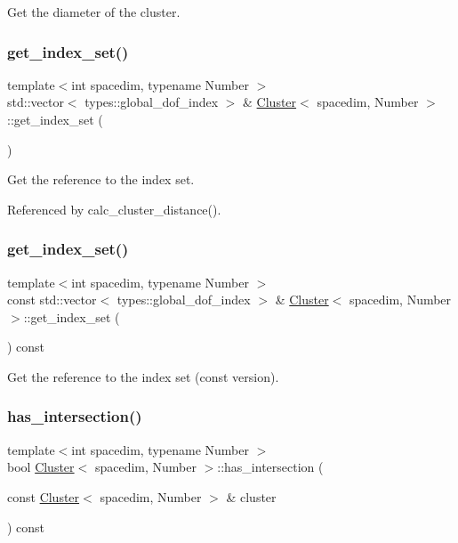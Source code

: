 Get the diameter of the cluster. \mbox{\label{classCluster_ada8786f2258b9fbeed2ed04bc1007c89}} 
\subsubsection{\texorpdfstring{get\+\_\+index\+\_\+set()}{get\_index\_set()}\hspace{0.1cm}{\footnotesize\ttfamily [1/2]}}
{\footnotesize\ttfamily template$<$int spacedim, typename Number $>$ \\
std\+::vector$<$ types\+::global\+\_\+dof\+\_\+index $>$ \& \hyperlink{classCluster}{Cluster}$<$ spacedim, Number $>$\+::get\+\_\+index\+\_\+set (\begin{DoxyParamCaption}{ }\end{DoxyParamCaption})}

Get the reference to the index set. 

Referenced by calc\+\_\+cluster\+\_\+distance().

\mbox{\label{classCluster_acd4c3a1c712aca32cffefb64f88a1b08}} 
\subsubsection{\texorpdfstring{get\+\_\+index\+\_\+set()}{get\_index\_set()}\hspace{0.1cm}{\footnotesize\ttfamily [2/2]}}
{\footnotesize\ttfamily template$<$int spacedim, typename Number $>$ \\
const std\+::vector$<$ types\+::global\+\_\+dof\+\_\+index $>$ \& \hyperlink{classCluster}{Cluster}$<$ spacedim, Number $>$\+::get\+\_\+index\+\_\+set (\begin{DoxyParamCaption}{ }\end{DoxyParamCaption}) const}

Get the reference to the index set (const version). \mbox{\label{classCluster_ad70ce1f046bb3b47fff585eaf6ec4856}} 
\subsubsection{\texorpdfstring{has\+\_\+intersection()}{has\_intersection()}}
{\footnotesize\ttfamily template$<$int spacedim, typename Number $>$ \\
bool \hyperlink{classCluster}{Cluster}$<$ spacedim, Number $>$\+::has\+\_\+intersection (\begin{DoxyParamCaption}\item[{const \hyperlink{classCluster}{Cluster}$<$ spacedim, Number $>$ \&}]{cluster }\end{DoxyParamCaption}) const}

